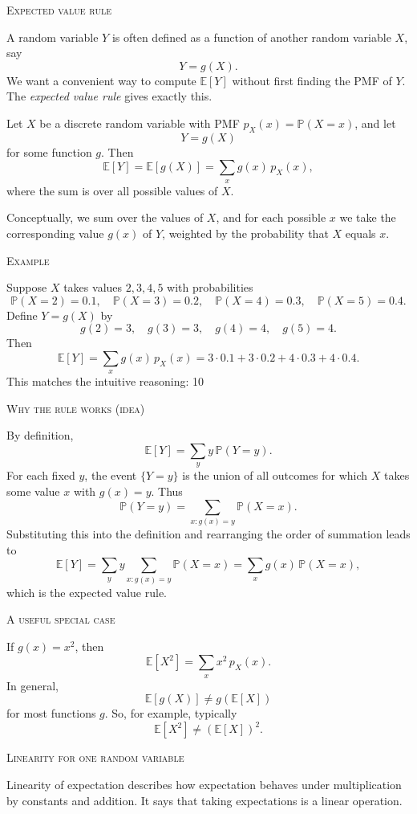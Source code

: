 \bigskip\textsc{Expected value rule}

A random variable \(Y\) is often defined as a function of another random variable \(X\), say
\[
Y = g(X).
\]
We want a convenient way to compute \(\mathbb{E}[Y]\) without first finding the PMF of \(Y\).  
The \textit{expected value rule} gives exactly this.


Let \(X\) be a discrete random variable with PMF \(p_X(x) = \mathbb{P}(X = x)\), and let
\[
Y = g(X)
\]
for some function \(g\).  
Then
\[
\mathbb{E}[Y] = \mathbb{E}[g(X)] = \sum_{x} g(x)\,p_X(x),
\]
where the sum is over all possible values of \(X\).  

Conceptually, we sum over the values of \(X\), and for each possible \(x\) we take the corresponding value \(g(x)\) of \(Y\), weighted by the probability that \(X\) equals \(x\).

\bigskip\textsc{Example}

Suppose \(X\) takes values \(2,3,4,5\) with probabilities
\[
\mathbb{P}(X=2)=0.1, \quad
\mathbb{P}(X=3)=0.2, \quad
\mathbb{P}(X=4)=0.3, \quad
\mathbb{P}(X=5)=0.4.
\]
Define \(Y = g(X)\) by
\[
g(2) = 3, \quad g(3) = 3, \quad g(4) = 4, \quad g(5) = 4.
\]
Then
\[
\mathbb{E}[Y]
= \sum_{x} g(x)\,p_X(x)
= 3 \cdot 0.1 + 3 \cdot 0.2 + 4 \cdot 0.3 + 4 \cdot 0.4.
\]
This matches the intuitive reasoning:  
10%

\bigskip\textsc{Why the rule works (idea)}

By definition,
\[
\mathbb{E}[Y] = \sum_{y} y\,\mathbb{P}(Y=y).
\]
For each fixed \(y\), the event \(\{Y=y\}\) is the union of all outcomes for which \(X\) takes some value \(x\) with \(g(x)=y\).  
Thus
\[
\mathbb{P}(Y=y) = \sum_{x : g(x)=y} \mathbb{P}(X=x).
\]
Substituting this into the definition and rearranging the order of summation leads to
\[
\mathbb{E}[Y]
= \sum_{y} y \sum_{x : g(x)=y} \mathbb{P}(X=x)
= \sum_{x} g(x)\,\mathbb{P}(X=x),
\]
which is the expected value rule.

\bigskip\textsc{A useful special case}

If \(g(x) = x^2\), then
\[
\mathbb{E}[X^2] = \sum_{x} x^2\,p_X(x).
\]
In general,
\[
\mathbb{E}[g(X)] \ne g(\mathbb{E}[X])
\]
for most functions \(g\).  
So, for example, typically
\[
\mathbb{E}[X^2] \ne (\mathbb{E}[X])^2.
\]


\bigskip\textsc{Linearity for one random variable}

Linearity of expectation describes how expectation behaves under multiplication by constants and addition.  
It says that taking expectations is a linear operation.


